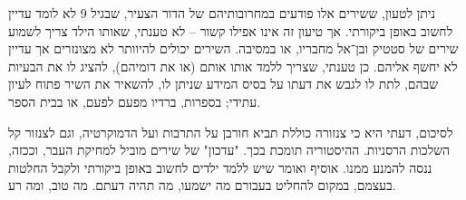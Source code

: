 \documentclass[12pt]{article}
\begin{document}
		ניתן לטעון, ששירים אלו פודעים במחרובותיהם של הדור הצעיר, שבגיל 9 לא לומד עדיין לחשוב באופן ביקורתי. אך טיעון זה אינו אפילו קשור – לא טענתי, שאותו הילד צריך לשמוע שירים של סטטיק ובן־אל מחבריו, או במסיבה. השירים יכולים להיוותר לא מצונזרים אך עדיין לא יחשף אליהם. כן טענתי, שצריך ללמד אותו אותם (או את דומיהם), להציג לו את הבעיות שבהם, לתת לו לגבש את דעתו על בסיס המידע שניתן לו, להשאיר את השיר פתוח לעיון עתידי; בספרות, ברדיו מפעם לפעם, או בבית הספר. 
		
		לסיכום, דעתי היא כי צנזורה כוללת תביא חורבן על התרבות ועל הדמוקרטיה, וגם לצנזור קל השלכות הרסניות. ההיסטוריה תומכת בכך. "עדכון" של שירים מוביל למחיקת העבר, וככזה, ננסה להמנע ממנו. אוסיף ואומר שיש ללמד ילדים לחשוב באופן ביקורתי ולקבל החלטות בעצמם, במקום להחליט בעבורם מה ישמעו, מה תהיה דעתם. מה טוב, ומה רע. 
	\hfill \blacksquare
	
	
\end{document}
